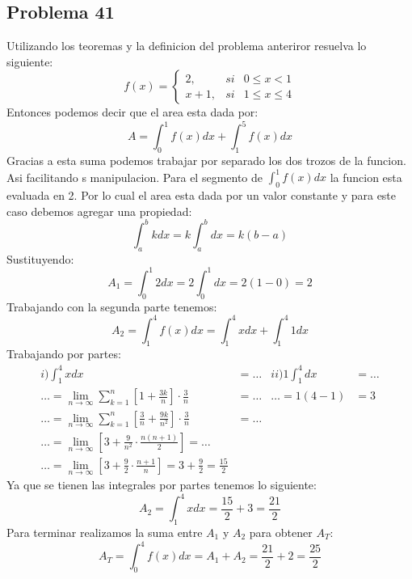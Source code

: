 \documentclass{article}
\begin{document}
      \subsection{Problema 41}
        Utilizando los teoremas y la definicion del problema anteriror resuelva lo siguiente:
        \begin{equation*}
          f(x) = \left\{
            \begin{array}{lcc}
              2, & si & 0\leq x < 1 \\
              x+1, & si & 1 \leq x \leq 4
            \end{array}
          \right.
        \end{equation*}
        Entonces podemos decir que el area esta dada por:
        \begin{equation}
          A = \int_{0}^{1} f(x)dx + \int_{1}^{5} f(x)dx
        \end{equation}
        Gracias a esta suma podemos trabajar por separado los dos trozos de la funcion. Asi facilitando s manipulacion.
        Para el segmento de $\int_{0}^{1}f(x)dx$ la funcion esta evaluada en 2. Por lo cual el area esta dada por un valor constante y para este caso debemos agregar una propiedad:
        \begin{equation}
          \int_{a}^{b}kdx = k\int_{a}^{b}dx = k(b-a)
        \end{equation}
        Sustituyendo:
        \begin{equation}
          A_1=\int_{0}^{1}2dx = 2\int_{0}^{1}dx = 2(1-0)=2
        \end{equation}
        Trabajando con la segunda parte tenemos:
        \begin{equation}
          A_2 = \int_{1}^{4} f(x)dx = \int_{1}^{4}xdx + \int_{1}^{4}1dx
        \end{equation}
        Trabajando por partes:
        \begin{align*}
          i) \int_{1}^{4}xdx&=\dots & ii) 1\int_{1}^{4}dx&= \dots \\ \dots=\lim_{n\to\infty} \sum_{k=1}^{n}\left[1+\frac{3k}{n}\right]\cdot\frac{3}{n}&=\dots & \dots = 1(4-1)&=3 \\
          \dots=\lim_{n\to\infty} \sum_{k=1}^{n}\left[\frac{3}{n}+\frac{9k}{n^2}\right]\cdot\frac{3}{n}&=\dots \\ \dots = \lim_{n\to\infty}\left[3+\frac{9}{n^2}\cdot\frac{n(n+1)}{2}\right] = \dots \\ \dots=\lim_{n\to\infty}\left[3+\frac{9}{2}\cdot\frac{n+1}{n}\right]= 3+\frac{9}{2} = \frac{15}{2}
        \end{align*}
        Ya que se tienen las integrales por partes tenemos lo siguiente:
        \begin{equation}
          A_2 = \int_{1}^{4}xdx = \frac{15}{2} + 3 = \frac{21}{2}
        \end{equation}
        Para terminar realizamos la suma entre \(A_1\) y \(A_2\) para obtener \(A_T\):
        \begin{equation}
          A_T = \int_{0}^{4} f(x)dx = A_1 + A_2 = \frac{21}{2} + 2 = \frac{25}{2}
        \end{equation}
\end{document}

